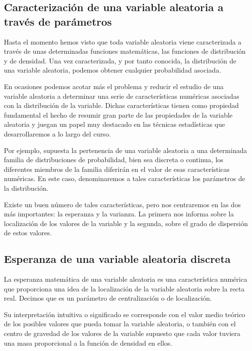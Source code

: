 \documentclass[
]{article}
\begin{document}
\subsection{Caracterización de una variable aleatoria a través de parámetros}\label{caracterizaciuxf3n-de-una-variable-aleatoria-a-travuxe9s-de-paruxe1metros}

Hasta el momento hemos visto que toda variable aleatoria viene
caracterizada a través de unas determinadas funciones matemáticas, las
funciones de distribución y de densidad. Una vez caracterizada, y por
tanto conocida, la distribución de una variable aleatoria, podemos
obtener cualquier probabilidad asociada.

En ocasiones podemos acotar más el problema y reducir el estudio de una
variable aleatoria a determinar una serie de características numéricas
asociadas con la distribución de la variable. Dichas características
tienen como propiedad fundamental el hecho de resumir gran parte de las
propiedades de la variable aleatoria y juegan un papel muy destacado en
las técnicas estadísticas que desarrollaremos a lo largo del curso.

Por ejemplo, supuesta la pertenencia de una variable aleatoria a una
determinada familia de distribuciones de probabilidad, bien sea discreta
o continua, los diferentes miembros de la familia diferirán en el valor
de esas características numéricas. En este caso, denominaremos a tales
características los parámetros de la distribución.

Existe un buen número de tales características, pero nos centraremos en
las dos más importantes: la esperanza y la varianza. La primera nos
informa sobre la localización de los valores de la variable y la
segunda, sobre el grado de dispersión de estos valores.

\subsection{Esperanza de una variable aleatoria discreta}\label{esperanza-de-una-variable-aleatoria-discreta}

La esperanza matemática de una variable aleatoria es una característica
numérica que proporciona una idea de la localización de la variable
aleatoria sobre la recta real. Decimos que es un parámetro de
centralización o de localización.

Su interpretación intuitiva o significado se corresponde con el valor
medio teórico de los posibles valores que pueda tomar la variable
aleatoria, o también con el centro de gravedad de los valores de la
variable supuesto que cada valor tuviera una masa proporcional a la
función de densidad en ellos.
\end{document}
